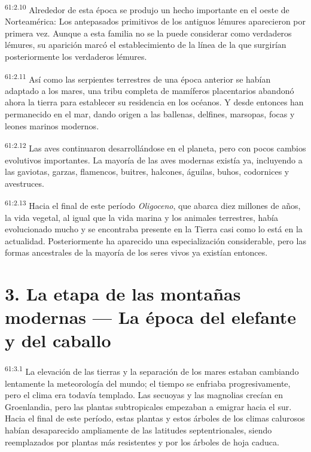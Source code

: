 \par
\textsuperscript{61:2.10} Alrededor de esta época se produjo un hecho importante en el oeste de Norteamérica: Los antepasados primitivos de los antiguos lémures aparecieron por primera vez. Aunque a esta familia no se la puede considerar como verdaderos lémures, su aparición marcó el establecimiento de la línea de la que surgirían posteriormente los verdaderos lémures.

\par
\textsuperscript{61:2.11} Así como las serpientes terrestres de una época anterior se habían adaptado a los mares, una tribu completa de mamíferos placentarios abandonó ahora la tierra para establecer su residencia en los océanos. Y desde entonces han permanecido en el mar, dando origen a las ballenas, delfines, marsopas, focas y leones marinos modernos.

\par
\textsuperscript{61:2.12} Las aves continuaron desarrollándose en el planeta, pero con pocos cambios evolutivos importantes. La mayoría de las aves modernas existía ya, incluyendo a las gaviotas, garzas, flamencos, buitres, halcones, águilas, buhos, codornices y avestruces.

\par
\textsuperscript{61:2.13} Hacia el final de este período \textit{Oligoceno}, que abarca diez millones de años, la vida vegetal, al igual que la vida marina y los animales terrestres, había evolucionado mucho y se encontraba presente en la Tierra casi como lo está en la actualidad. Posteriormente ha aparecido una especialización considerable, pero las formas ancestrales de la mayoría de los seres vivos ya existían entonces.

\section*{3. La etapa de las montañas modernas --- La época del elefante y del caballo}
\par
\textsuperscript{61:3.1} La elevación de las tierras y la separación de los mares estaban cambiando lentamente la meteorología del mundo; el tiempo se enfriaba progresivamente, pero el clima era todavía templado. Las secuoyas y las magnolias crecían en Groenlandia, pero las plantas subtropicales empezaban a emigrar hacia el sur. Hacia el final de este período, estas plantas y estos árboles de los climas calurosos habían desaparecido ampliamente de las latitudes septentrionales, siendo reemplazados por plantas más resistentes y por los árboles de hoja caduca.

